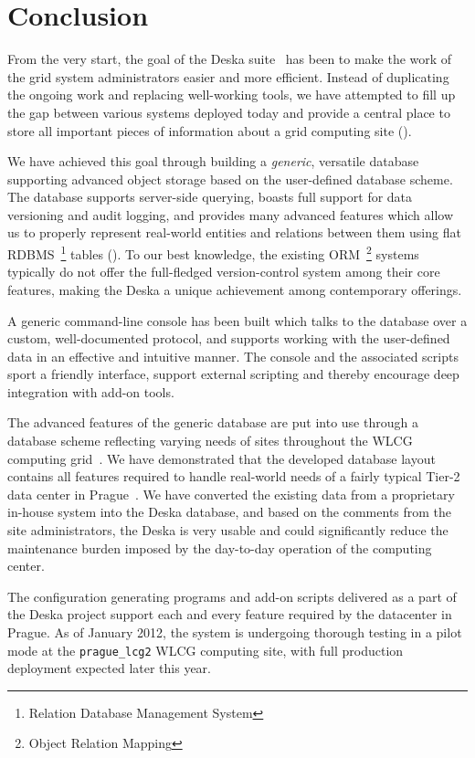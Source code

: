 \documentclass[deska]{subfiles}
\begin{document}
\chapter{Conclusion}
\label{sec:conclusion}

From the very start, the goal of the Deska suite~\cite{deska-project} has been to make the work of the grid system
administrators easier and more efficient.  Instead of duplicating the ongoing work and replacing well-working tools, we
have attempted to fill up the gap between various systems deployed today and provide a central place to store all
important pieces of information about a grid computing site ().

We have achieved this goal through building a {\em generic}, versatile database supporting advanced object storage based
on the user-defined database scheme.  The database supports server-side querying, boasts full support for data
versioning and audit logging, and provides many advanced features which allow us to properly represent real-world
entities and relations between them using flat RDBMS~\footnote{Relation Database Management System} tables
().  To our best knowledge, the existing ORM~\footnote{Object Relation Mapping}
systems typically do not offer the full-fledged version-control system among their core features, making the Deska a
unique achievement among contemporary offerings.

A generic command-line console has been built which talks to the database over a custom, well-documented protocol, and
supports working with the user-defined data in an effective and intuitive manner.  The console and the associated
scripts sport a friendly interface, support external scripting and thereby encourage deep integration with add-on tools.

The advanced features of the generic database are put into use through a database scheme reflecting varying needs of
sites throughout the WLCG computing grid~\cite{wlcg}.  We have demonstrated that the developed database layout contains
all features required to handle real-world needs of a fairly typical Tier-2 data center in Prague~\cite{farm}.  We have
converted the existing data from a proprietary in-house system into the Deska database, and based on the comments from
the site administrators, the Deska is very usable and could significantly reduce the maintenance burden imposed by the
day-to-day operation of the computing center.

The configuration generating programs and add-on scripts delivered as a part of the Deska project support each and every
feature required by the datacenter in Prague.  As of January 2012, the system is undergoing thorough testing in a pilot
mode at the {\tt prague\_lcg2} WLCG computing site, with full production deployment expected later this year.
\end{document}

